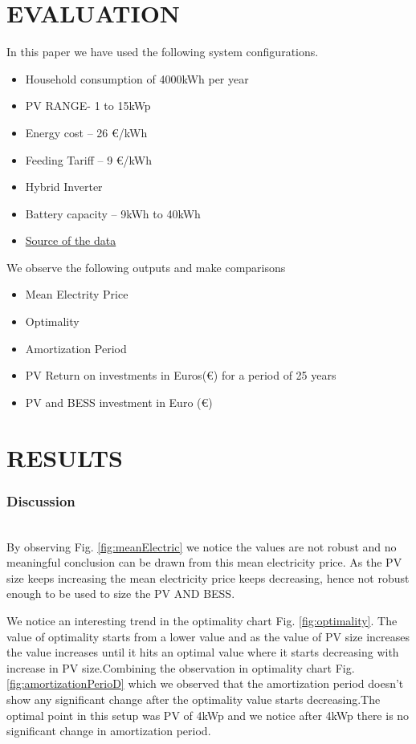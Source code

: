 \documentclass[sigconf,12pt,nonacm]{acmart}
\begin{document}
\section{EVALUATION}
In this paper we have used the following system configurations.
\begin{itemize}
    \item Household consumption of 4000kWh per year
    \item PV RANGE- 1 to 15kWp
    \item Energy cost – 26 €/kWh
    \item Feeding Tariff – 9 €/kWh 
    \item Hybrid Inverter
    \item Battery capacity – 9kWh to 40kWh
    \item \href{https://neoom-optimization-tool.azurewebsites.net/swagger . }{Source of the data }
\end{itemize}
We observe the following outputs and make comparisons
\begin{itemize}
    \item Mean Electrity Price
    \item Optimality
    \item Amortization Period\cite{tuovila_2019_what}
    \item PV Return on investments in Euros(€) for a period of 25 years
    \item PV and BESS investment in Euro (€)
\end{itemize}

\section{RESULTS}
\subsubsection{Discussion}
\hfill\\
By observing Fig. \ref{fig:meanElectric} we notice the values are not robust and no meaningful conclusion can be drawn from this mean electricity price. As the PV size keeps increasing the mean electricity price keeps decreasing, hence not robust enough to be used to size the PV AND BESS.

We notice an interesting trend in the optimality chart Fig. \ref{fig:optimality}. The value of optimality starts from a lower value and as the value of PV size increases the value increases until it hits an optimal value where it starts decreasing with increase in PV size.Combining the observation in optimality chart Fig.\ref{fig:amortizationPerioD} which we observed that the amortization period doesn't show any significant change after the optimality value starts decreasing.The optimal point in this setup was PV of 4kWp and we notice after 4kWp there is no significant change in amortization period.
\end{document}
